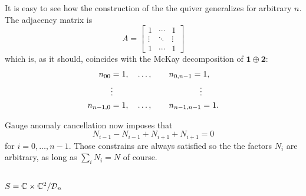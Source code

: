         It is easy to see how the construction of the the quiver generalizes for arbitrary $n$. The adjacency matrix is
        \begin{equation}
            A=
            \begin{bmatrix}
                1 & \cdots & 1 \\
                \vdots & \ddots & \vdots \\
                1 & \cdots & 1
            \end{bmatrix}
        \end{equation}
        which is, as it should, coincides with the McKay decomposition of $\boldsymbol{1}\oplus\boldsymbol{2}$:
        \begin{align}
            \begin{split}
                n_{00} &= 1,\quad\dots,\qquad n_{0,n-1}=1,\\
                &\vdots\hspace{3.7cm}\vdots\\
                n_{n-1,0} &= 1,\quad\dots,\qquad n_{n-1,n-1}=1.
            \end{split}
        \end{align}
        
        Gauge anomaly cancellation now imposes that
        \begin{equation}
            N_{i-1}-N_{i-1}+N_{i+1}+N_{i+1}=0
        \end{equation}
        for $i=0,\dots,n-1$. Those constrains are always satisfied so the the factors $N_i$ are arbitrary, as long as $\sum_iN_i=N$ of course.

    \subsection{$S=\mathbb{C}\times\mathbb{C}^2/\mathcal{D}_n$}


